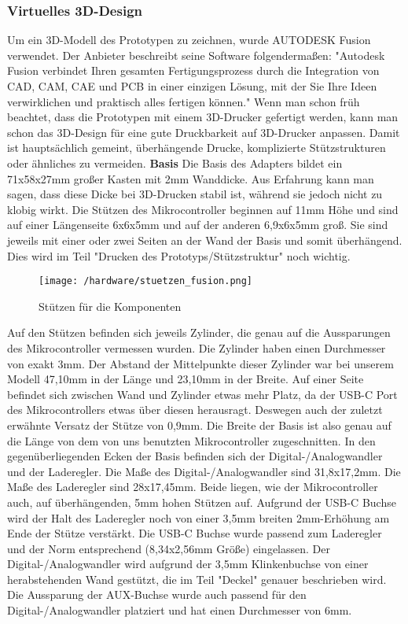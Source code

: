 \documentclass[11pt, twoside]{article}
\begin{document}
\subsubsection{Virtuelles 3D-Design}
Um ein 3D-Modell des Prototypen zu zeichnen, wurde AUTODESK Fusion verwendet. Der Anbieter beschreibt seine Software folgendermaßen: "Autodesk Fusion verbindet Ihren gesamten Fertigungsprozess durch die Integration von CAD, CAM, CAE und PCB in einer einzigen Lösung, mit der Sie Ihre Ideen verwirklichen und praktisch alles fertigen können."\newline
Wenn man schon früh beachtet, dass die Prototypen mit einem 3D-Drucker gefertigt werden, kann man schon das 3D-Design für eine gute Druckbarkeit auf 3D-Drucker anpassen. Damit ist hauptsächlich gemeint, überhängende Drucke, komplizierte Stützstrukturen oder ähnliches zu vermeiden.
\vspace{4mm}\newline
\textbf{Basis} \newline
Die Basis des Adapters bildet ein 71x58x27mm großer Kasten mit 2mm Wanddicke. Aus Erfahrung kann man sagen, dass diese Dicke bei 3D-Drucken stabil ist, während sie jedoch nicht zu klobig wirkt.\newline
Die Stützen des Mikrocontroller beginnen auf 11mm Höhe und sind auf einer Längenseite 6x6x5mm und auf der anderen 6,9x6x5mm groß. Sie sind jeweils mit einer oder zwei Seiten an der Wand der Basis und somit überhängend. Dies wird im Teil "Drucken des Prototyps/Stützstruktur" noch wichtig.\newline
\begin{figure}[H]
	\texttt{[image: /hardware/stuetzen\_fusion.png]}
	\caption{Stützen für die Komponenten}
\end{figure}
Auf den Stützen befinden sich jeweils Zylinder, die genau auf die Aussparungen des Mikrocontroller vermessen wurden. Die Zylinder haben einen Durchmesser von exakt 3mm. Der Abstand der Mittelpunkte dieser Zylinder war bei unserem Modell 47,10mm in der Länge und 23,10mm in der Breite. Auf einer Seite befindet sich zwischen Wand und Zylinder etwas mehr Platz, da der USB-C Port des Mikrocontrollers etwas über diesen herausragt. Deswegen auch der zuletzt erwähnte Versatz der Stütze von 0,9mm.\newline
Die Breite der Basis ist also genau auf die Länge von dem von uns benutzten Mikrocontroller zugeschnitten.\newline
In den gegenüberliegenden Ecken der Basis befinden sich der Digital-/Analogwandler und der Laderegler. Die Maße des Digital-/Analogwandler sind 31,8x17,2mm. Die Maße des Laderegler sind 28x17,45mm. Beide liegen, wie der Mikrocontroller auch, auf überhängenden, 5mm hohen Stützen auf. Aufgrund der USB-C Buchse wird der Halt des Laderegler noch von einer 3,5mm breiten 2mm-Erhöhung am Ende der Stütze verstärkt. Die USB-C Buchse wurde passend zum Laderegler und der Norm entsprechend (8,34x2,56mm Größe) eingelassen. Der Digital-/Analogwandler wird aufgrund der 3,5mm Klinkenbuchse von einer herabstehenden Wand gestützt, die im Teil "Deckel" genauer beschrieben wird. Die Aussparung der AUX-Buchse wurde auch passend für den Digital-/Analogwandler platziert und hat einen Durchmesser von 6mm.\newline
\end{document}
